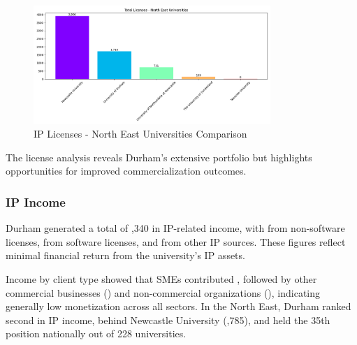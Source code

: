 \documentclass[journal,onecolumn, 10pt,draftclsnofoot]{IEEEtran}
\begin{document}
\begin{figure}[h]
\centering
\includegraphics[width=0.8\textwidth]{Fig/figure23.license_ne_comparison.png}
\caption{IP Licenses - North East Universities Comparison}
\label{fig:license-ne-comparison}
\end{figure}

The license analysis reveals Durham's extensive portfolio but highlights opportunities for improved commercialization outcomes.

\subsubsection{IP Income}

Durham generated a total of ,340 in IP-related income, with  from non-software licenses,  from software licenses, and  from other IP sources. These figures reflect minimal financial return from the university's IP assets.

Income by client type showed that SMEs contributed , followed by other commercial businesses () and non-commercial organizations (), indicating generally low monetization across all sectors. In the North East, Durham ranked second in IP income, behind Newcastle University (,785), and held the 35th position nationally out of 228 universities.
\end{document}
